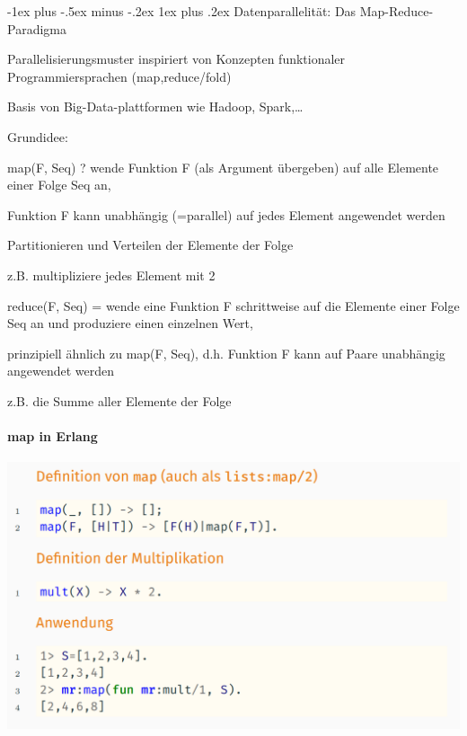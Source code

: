 \documentclass[10pt]{article}
\makeatletter
\renewcommand{\subsubsection}{\@startsection{subsubsection}{3}{0mm}%
                                {-1ex plus -.5ex minus -.2ex}%
                                {1ex plus .2ex}%
                                {\normalfont\small\bfseries}}
\makeatother
\begin{document}
  \subsubsection{Datenparallelität: Das Map-Reduce-Paradigma}
  \begin{itemize*}
    \item Parallelisierungsmuster inspiriert von Konzepten funktionaler Programmiersprachen (map,reduce/fold)
    \item Basis von Big-Data-plattformen wie Hadoop, Spark,…
    \item Grundidee:
    \begin{itemize*}
      \item map(F, Seq) ? wende Funktion F (als Argument übergeben) auf alle Elemente einer Folge Seq an,
      \begin{itemize*}
        \item Funktion F kann unabhängig (=parallel) auf jedes Element angewendet werden
        \item Partitionieren und Verteilen der Elemente der Folge
        \item z.B. multipliziere jedes Element mit 2
      \end{itemize*}
      \item reduce(F, Seq) = wende eine Funktion F schrittweise auf die Elemente einer Folge Seq an und produziere einen einzelnen Wert,
      \begin{itemize*}
        \item prinzipiell ähnlich zu map(F, Seq), d.h. Funktion F kann auf Paare unabhängig angewendet werden
        \item z.B. die Summe aller Elemente der Folge
      \end{itemize*}
    \end{itemize*}
  \end{itemize*}
  
  \paragraph{map in Erlang}
  
  \begin{center}
    \includegraphics[width=0.4\linewidth]{Assets/Programmierparadigmen-erlang-map}
  \end{center}
  
\end{document}
